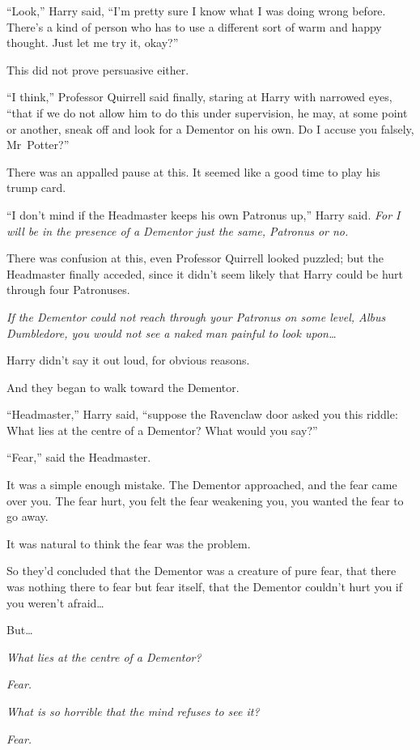 “Look,” Harry said, “I’m pretty sure I know what I was doing wrong before. There’s a kind of person who has to use a different sort of warm and happy thought. Just let me try it, okay?”

This did not prove persuasive either.

“I think,” Professor Quirrell said finally, staring at Harry with narrowed eyes, “that if we do not allow him to do this under supervision, he may, at some point or another, sneak off and look for a Dementor on his own. Do I accuse you falsely, Mr~Potter?”

There was an appalled pause at this. It seemed like a good time to play his trump card.

“I don’t mind if the Headmaster keeps his own Patronus up,” Harry said. \emph{For I will be in the presence of a Dementor just the same, Patronus or no.}

There was confusion at this, even Professor Quirrell looked puzzled; but the Headmaster finally acceded, since it didn’t seem likely that Harry could be hurt through four Patronuses.

\emph{If the Dementor could not reach through your Patronus on some level, Albus Dumbledore, you would not see a naked man painful to look upon…}

Harry didn’t say it out loud, for obvious reasons.

And they began to walk toward the Dementor.

“Headmaster,” Harry said, “suppose the Ravenclaw door asked you this riddle: What lies at the centre of a Dementor? What would you say?”

“Fear,” said the Headmaster.

It was a simple enough mistake. The Dementor approached, and the fear came over you. The fear hurt, you felt the fear weakening you, you wanted the fear to go away.

It was natural to think the fear was the problem.

So they’d concluded that the Dementor was a creature of pure fear, that there was nothing there to fear but fear itself, that the Dementor couldn’t hurt you if you weren’t afraid…

But…

\emph{What lies at the centre of a Dementor?}

\emph{Fear.}

\emph{What is so horrible that the mind refuses to see it?}

\emph{Fear.}

